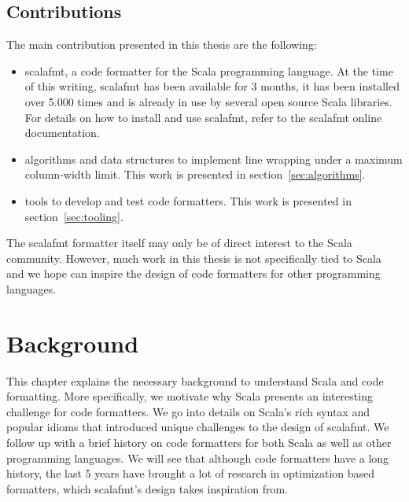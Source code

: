 \documentclass[11pt,a4paper]{article}
\newcommand{\scalafmt}{\texttt{scalafmt}}
\begin{document}

\subsection{Contributions}
The main contribution presented in this thesis are the following:
\begin{itemize}
  \item scalafmt, a code formatter for the Scala programming language.
    At the time of this writing, scalafmt has been available for 3 months, it has been installed over 5.000 times and is already in use by several open source Scala libraries.
    For details on how to install and use scalafmt, refer to the scalafmt online documentation\autocite{geirsson_scalafmt_????}.

  \item algorithms and data structures to implement line wrapping under a maximum column-width limit.
    This work is presented in section~\ref{sec:algorithms}.
  \item tools to develop and test code formatters.
    This work is presented in section~\ref{sec:tooling}.
\end{itemize}
The scalafmt formatter itself may only be of direct interest to the Scala community.
However, much work in this thesis is not specifically tied to Scala and we hope can inspire the design of code formatters for other programming languages.

\section{Background}
This chapter explains the necessary background to understand Scala and code formatting.
More specifically, we motivate why Scala presents an interesting challenge for code formatters.
We go into details on Scala's rich syntax and popular idioms that introduced unique challenges to the design of scalafmt.
We follow up with a brief history on code formatters for both Scala as well as other programming languages.
We will see that although code formatters have a long history, the last 5 years have brought a lot of research in optimization based formatters, which scalafmt's design takes inspiration from.
\end{document}
